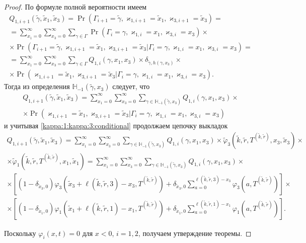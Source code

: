 \documentclass{report}
\begin{document}
\begin{proof}
По формуле полной вероятности имеем
\begin{multline*}
Q_{1,i+1}(\tilde{\gamma},\tilde{x}_1,\tilde{x}_3) = \Pr(\Gamma_{i+1}=\tilde{\gamma}, \varkappa_{1,i+1}=\tilde{x}_1, \varkappa_{3,i+1}=\tilde{x}_3) = \\
= \sum_{x_1=0}^{\infty}\sum_{x_3=0}^{\infty}\sum_{\gamma \in \Gamma} \Pr(\Gamma_{i}=\gamma, \varkappa_{1,i}=x_1, \varkappa_{3,i}=x_3) \times \\ \times  \Pr(\Gamma_{i+1}=\tilde{\gamma}, \varkappa_{1,i+1}=\tilde{x}_1, \varkappa_{3,i+1}=\tilde{x}_3 | \Gamma_{i}=\gamma,\varkappa_{1,i}=x_1, \varkappa_{3,i}=x_3) =  \\ 
=\sum_{x_1=0}^{\infty} \sum_{x_3=0}^{\infty}\sum_{\gamma \in \Gamma} Q_{1,i}(\gamma, x_1, x_3) \times \delta_{\tilde{\gamma},h(\gamma,x_3)}\times \\ \times
\Pr(\varkappa_{1,i+1}=\tilde{x}_1 , \varkappa_{3,i+1}=\tilde{x}_3 | \Gamma_{i}=\gamma, \varkappa_{1,i}=x_1, \varkappa_{3,i}=x_3).
\end{multline*}
Тогда из определения $ {\mathbb H}_{-1}(\tilde{\gamma},x_3)$ следует, что 
\begin{multline*}
Q_{1,i+1}(\tilde{\gamma},\tilde{x}_1, \tilde{x}_3) =\sum_{x_1=0}^{\infty} \sum_{x_3=0}^{\infty}\sum_{\gamma \in {\mathbb H}_{-1}(\tilde{\gamma},x_3)} Q_{1,i}(\gamma,x_1, x_3) \times \\ \times 
\Pr(\varkappa_{1,i+1}=\tilde{x}_1, \varkappa_{3,i+1}=\tilde{x}_3 | \Gamma_{i}=\gamma, \varkappa_{1,i}=x_1, \varkappa_{3,i}=x_3)
\end{multline*}
и учитывая \eqref{kappa:1:kappa:3:conditional} продолжаем цепочку выкладок
\begin{multline*}
Q_{1,i+1}(\tilde{\gamma},\tilde{x}_1, \tilde{x}_3)=\sum_{x_1=0}^{\infty} \sum_{x_3=0}^{\infty}\sum_{\gamma \in {\mathbb H}_{-1}(\tilde{\gamma},x_3)} Q_{1,i}(\gamma,x_1,x_3) \times 
\tilde{\varphi}_3(\tilde{k},\tilde{r}, T^{(\tilde{k},\tilde{r})},x_3,\tilde{x}_3) \times \\ \times 
\tilde{\varphi}_1(\tilde{k},\tilde{r}, T^{(\tilde{k},\tilde{r})},x_1,\tilde{x}_1) 
= \sum_{x_1=0}^{\infty} \sum_{x_3=0}^{\infty} \sum_{\gamma \in {\mathbb H}_{-1}(\tilde{\gamma},x_3)} Q_{1,i}(\gamma,x_1, x_3) \times \\ \times
[ (1-\delta_{\tilde{x}_3,0})\varphi_3(\tilde{x}_3 + \ell(\tilde{k},\tilde{r},3) - x_3,T^{(\tilde{k},\tilde{r})}) +\delta_{\tilde{x}_3,0} \sum_{a=0}^{\ell(\tilde{k},\tilde{r},3)-x_3}\varphi_3(a,T^{(\tilde{k},\tilde{r})})] \times \\ 
\times 
[ (1-\delta_{\tilde{x}_1,0})\varphi_1(\tilde{x}_1 + \ell(\tilde{k},\tilde{r},1) - x_1,T^{(\tilde{k},\tilde{r})}) +\delta_{\tilde{x}_1,0} \sum_{a=0}^{\ell(\tilde{k},\tilde{r},1)-x_1}\varphi_1(a,T^{(\tilde{k},\tilde{r})})].
\end{multline*}

Поскольку  $\varphi_i(x,t)=0$ для $x<0$, $i=1,2$, получаем утверждение теоремы.
\end{proof}
\end{document}

